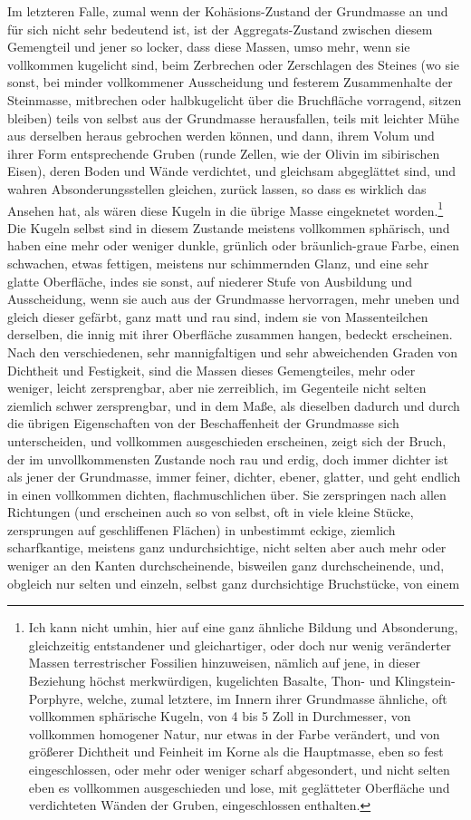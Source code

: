 \documentclass[a4paper, 11pt, oneside, german]{article}
\begin{document}
Im letzteren Falle, zumal wenn der Kohäsions-Zustand der Grundmasse an und für sich nicht sehr bedeutend ist, ist der Aggregats-Zustand zwischen diesem Gemengteil und jener so locker, dass diese Massen, umso mehr, wenn sie vollkommen kugelicht sind, beim Zerbrechen oder Zerschlagen des Steines (wo sie sonst, bei minder vollkommener Ausscheidung und festerem Zusammenhalte der Steinmasse, mitbrechen oder halbkugelicht über die Bruchfläche vorragend, sitzen bleiben) teils von selbst aus der Grundmasse herausfallen, teils mit leichter Mühe aus derselben heraus gebrochen werden können, und dann, ihrem Volum und ihrer Form entsprechende Gruben (runde Zellen, wie der Olivin im sibirischen Eisen), deren Boden und Wände verdichtet, und gleichsam abgeglättet sind, und wahren Absonderungsstellen gleichen, zurück lassen, so dass es wirklich das Ansehen hat, als wären diese Kugeln in die übrige Masse eingeknetet worden.\footnote{Ich kann nicht umhin, hier auf eine ganz ähnliche Bildung und Absonderung, gleichzeitig entstandener und gleichartiger, oder doch nur wenig veränderter Massen terrestrischer Fossilien hinzuweisen, nämlich auf jene, in dieser Beziehung höchst merkwürdigen, kugelichten Basalte, Thon- und Klingstein-Porphyre, welche, zumal letztere, im Innern ihrer Grundmasse ähnliche, oft vollkommen sphärische Kugeln, von 4 bis 5 Zoll in Durchmesser, von vollkommen homogener Natur, nur etwas in der Farbe verändert, und von größerer Dichtheit und Feinheit im Korne als die Hauptmasse, eben so fest eingeschlossen, oder mehr oder weniger scharf abgesondert, und nicht selten eben es vollkommen ausgeschieden und lose, mit geglätteter Oberfläche und verdichteten Wänden der Gruben, eingeschlossen enthalten.} Die Kugeln selbst sind in diesem Zustande meistens vollkommen sphärisch, und haben eine mehr oder weniger dunkle, grünlich oder bräunlich-graue Farbe, einen schwachen, etwas fettigen, meistens nur schimmernden Glanz, und eine sehr glatte Oberfläche, indes sie sonst, auf niederer Stufe von Ausbildung und Ausscheidung, wenn sie auch aus der Grundmasse hervorragen, mehr uneben und gleich dieser gefärbt, ganz matt und rau sind, indem sie von Massenteilchen derselben, die innig mit ihrer Oberfläche zusammen hangen, bedeckt erscheinen. Nach den verschiedenen, sehr mannigfaltigen und sehr abweichenden Graden von Dichtheit und Festigkeit, sind die Massen dieses Gemengteiles, mehr oder weniger, leicht zersprengbar, aber nie zerreiblich, im Gegenteile nicht selten ziemlich schwer zersprengbar, und in dem Maße, als dieselben dadurch und durch die übrigen Eigenschaften von der Beschaffenheit der Grundmasse sich unterscheiden, und vollkommen ausgeschieden erscheinen, zeigt sich der Bruch, der im unvollkommensten Zustande noch rau und erdig, doch immer dichter ist als jener der Grundmasse, immer feiner, dichter, ebener, glatter, und geht endlich in einen vollkommen dichten, flachmuschlichen über. Sie zerspringen nach allen Richtungen (und erscheinen auch so von selbst, oft in viele kleine Stücke, zersprungen auf geschliffenen Flächen) in unbestimmt eckige, ziemlich scharfkantige, meistens ganz undurchsichtige, nicht selten aber auch mehr oder weniger an den Kanten durchscheinende, bisweilen ganz durchscheinende, und, obgleich nur selten und einzeln, selbst ganz durchsichtige Bruchstücke, von einem 
\end{document}
